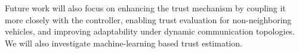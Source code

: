 Future work will also focus on enhancing the trust mechanism by coupling it more closely with the controller, enabling trust evaluation for non-neighboring vehicles, and improving adaptability under dynamic communication topologies. 
We will also investigate machine-learning based trust estimation.
